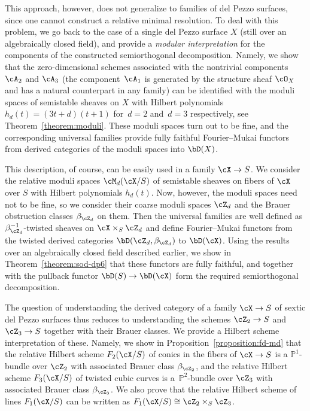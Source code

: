 \documentclass[11pt]{amsart}
\renewcommand{\P}{{\mathbb{P}}}
\theoremstyle{plain}
\theoremstyle{definition}
\theoremstyle{remark}
\begin{document}


This approach, however, does not generalize to families of del Pezzo surfaces, since one cannot construct a relative minimal resolution.
To deal with this problem, we go back to the case of a single del Pezzo surface $X$ (still over an algebraically closed field), 
and provide a \emph{modular interpretation} for the components of the constructed semiorthogonal decomposition. 
Namely, we show that the zero-dimensional schemes associated with the nontrivial components $\cA_2$ and $\cA_3$ 
(the component~$\cA_1$ is generated by the structure sheaf $\cO_X$ and has a natural counterpart in any family)
can be identified with the moduli spaces of semistable sheaves on $X$ with Hilbert polynomials $h_d(t) = (3t + d)(t+1)$ 
for~$d = 2$ and~$d = 3$ respectively, see Theorem~\ref{theorem:moduli}.
These moduli spaces turn out to be fine, and the corresponding universal families provide 
fully faithful Fourier--Mukai functors from derived categories of the moduli spaces into $\bD(X)$.

This description, of course, can be easily used in a family $\cX \to S$.
We consider the relative moduli spaces $\cM_d(\cX/S)$ of semistable sheaves on fibers of $\cX$ over $S$ with Hilbert polynomials $h_d(t)$.
Now, however, the moduli spaces need not to be fine, so we consider their coarse moduli spaces $\cZ_d$ and the Brauer obstruction classes $\beta_{\cZ_d}$ on them.
Then the universal families are well defined as $\beta_{\cZ_d}^{-1}$-twisted sheaves on $\cX \times_S \cZ_d$ and define Fourier--Mukai functors from the twisted derived categories $\bD(\cZ_d,\beta_{\cZ_d})$ to $\bD(\cX)$.
Using the results over an algebraically closed field described earlier, we show in Theorem~\ref{theorem:sod-dp6} that these functors are fully faithful, 
and together with the pullback functor $\bD(S) \to \bD(\cX)$ form the required semiorthogonal decomposition.



The question of understanding the derived category of a family $\cX \to S$ of sextic del Pezzo surfaces thus reduces to understanding the schemes $\cZ_2 \to S$ and $\cZ_3 \to S$ together with their Brauer classes.
We provide a Hilbert scheme interpretation of these. 
Namely, we show in Proposition~\ref{proposition:fd-md} that 
the relative Hilbert scheme $F_2(\cX/S)$ of conics in the fibers of $\cX \to S$ is a $\P^1$-bundle over $\cZ_2$ with associated Brauer class $\beta_{\cZ_2}$, and
the relative Hilbert scheme $F_3(\cX/S)$ of twisted cubic curves is a~$\P^2$-bundle over $\cZ_3$ with associated Brauer class $\beta_{\cZ_3}$.
We also prove that the relative Hilbert scheme of lines $F_1(\cX/S)$ can be written as $F_1(\cX/S) \cong \cZ_2 \times_S \cZ_3$.
\end{document}

